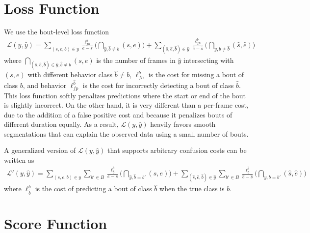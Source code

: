 \documentclass[10pt, onecolumn]{article}
\newcommand{\1}{\textbf{1}}
\begin{document}
\section{Loss Function}
We use the bout-level loss function 
\begin{eqnarray}
\mathcal{L}(y,\hat{y}) = \sum\limits_{(s,e,b) \in y} \frac{\ell^b_{fn}}{e-s} \bigg( \bigcap_{\hat{y},\hat{b} \ne b}(s,e) \bigg) + \sum\limits_{(\hat{s},\hat{e},\hat{b}) \in \hat{y}} \frac{\ell^b_{fp}}{\hat{e}-\hat{s}} \bigg( \bigcap_{y,b \ne \hat{b}}(\hat{s},\hat{e}) \bigg) 
\label{eq:loss_fp}
\end{eqnarray}
where $\bigcap_{(\hat{s},\hat{e},\hat{b}) \in \hat{y},\hat{b} \ne b}(s,e)$ is the number of frames in $\hat{y}$ intersecting with $(s,e)$ with different behavior class $\hat{b} \ne b$, $\ell^b_{fn}$ is the cost for missing a bout of class $b$, and  behavior $\ell^{\hat{b}}_{fp}$ is the cost for incorrectly detecting a bout of class $\hat{b}$.  This loss function softly penalizes predictions where the start or end of the bout is slightly incorrect.  On the other hand, it is very different than a per-frame cost, due to the addition of a false positive cost and because it penalizes bouts of different duration equally.  As a result, $\mathcal{L}(y,\hat{y})$ heavily favors smooth segmentations that can explain the observed data using a small number of bouts.

A generalized version of $\mathcal{L}(y,\hat{y})$ that supports arbitrary confusion costs can be written as
\begin{eqnarray}
\mathcal{L}'(y,\hat{y}) = \sum\limits_{(s,e,b) \in y} \sum\limits_{b'\in B} \frac{\ell^b_{\hat{b}}}{e-s} \bigg( \bigcap_{\hat{y},\hat{b}=b'}(s,e) \bigg) +  \sum\limits_{(\hat{s},\hat{e},\hat{b}) \in \hat{y}} \sum\limits_{b' \in B} \frac{\ell^{\hat{b}}_b}{\hat{e}-\hat{s}} \bigg( \bigcap_{y,b=b'}(\hat{s},\hat{e}) \bigg)
\label{eq:loss_conf}
\end{eqnarray}
where $\ell^b_{\hat{b}}$ is the cost of predicting a bout of class $\hat{b}$ when the true class is $b$.

\section{Score Function}
\end{document}

